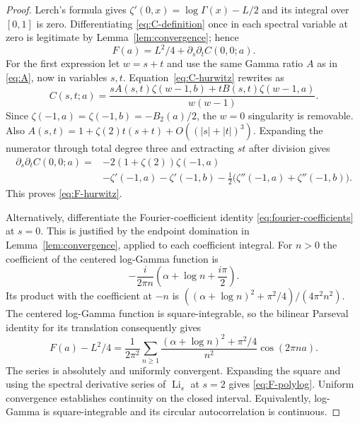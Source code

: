 \documentclass[11pt]{article}
\numberwithin{equation}{section}
\theoremstyle{definition}
\theoremstyle{remark}
\DeclareMathOperator{\Li}{Li}
\begin{document}
\begin{proof}
Lerch's formula gives
$\zeta'(0,x)=\log\Gamma(x)-L/2$ and its integral over $[0,1]$ is
zero. Differentiating \eqref{eq:C-definition} once in each spectral
variable at zero is legitimate by Lemma~\ref{lem:convergence}; hence
\begin{equation}
 F(a)=L^2/4+\partial_s\partial_tC(0,0;a).
 \label{eq:F-derivative}
\end{equation}
For the first expression let $w=s+t$ and use the same Gamma ratio $A$
as in \eqref{eq:A}, now in variables $s,t$. Equation~\eqref{eq:C-hurwitz}
rewrites as
\begin{equation}
 C(s,t;a)=\frac{sA(s,t)\zeta(w-1,b)+tB(s,t)\zeta(w-1,a)}{w(w-1)}.
 \label{eq:C-near-zero}
\end{equation}
Since $\zeta(-1,a)=\zeta(-1,b)=-B_2(a)/2$, the $w=0$
singularity is removable. Also
$A(s,t)=1+\zeta(2)t(s+t)+O((|s|+|t|)^3)$.
Expanding the numerator through total degree three and extracting $st$
after division gives
\begin{align*}
 \partial_s\partial_t C(0,0;a)
 ={}&-2(1+\zeta(2))\zeta(-1,a)\\
    &-\zeta'(-1,a)-\zeta'(-1,b)
      -\tfrac12\bigl(\zeta''(-1,a)+\zeta''(-1,b)\bigr).
\end{align*}
This proves \eqref{eq:F-hurwitz}.

Alternatively, differentiate the Fourier-coefficient identity
\eqref{eq:fourier-coefficients} at $s=0$. This is justified by the
endpoint domination in Lemma~\ref{lem:convergence}, applied to each
coefficient integral. For $n>0$ the coefficient of the centered
log-Gamma function is
\[
 -\frac{i}{2\pi n}\left(\alpha+\log n+\frac{i\pi}{2}\right).
\]
Its product with the coefficient at $-n$ is
$((\alpha+\log n)^2+\pi^2/4)/(4\pi^2n^2)$.
The centered log-Gamma function is square-integrable, so the bilinear
Parseval identity for its translation consequently gives
\[
 F(a)-L^2/4=\frac1{2\pi^2}\sum_{n\ge1}
 \frac{(\alpha+\log n)^2+\pi^2/4}{n^2}\cos(2\pi na).
\]
The series is absolutely and uniformly convergent. Expanding the square
and using the spectral derivative series of $\Li_s$ at $s=2$ gives
\eqref{eq:F-polylog}. Uniform convergence establishes continuity on the
closed interval. Equivalently, log-Gamma is square-integrable and its
circular autocorrelation is continuous.
\end{proof}
\end{document}
